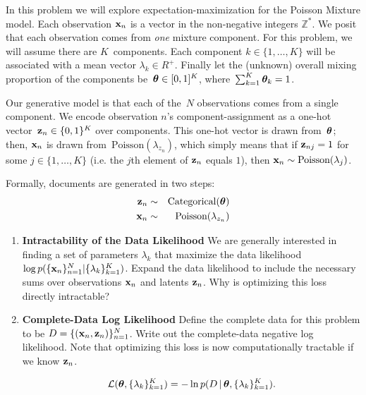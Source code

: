 \documentclass[submit]{harvardml}
\begin{document}
\begin{problem}

In this problem we will explore expectation-maximization for the
Poisson Mixture model.  Each observation $\mathbf{x}_n$ is a vector in the
non-negative integers $\mathbb{Z}^{*}$.  We posit that each
observation comes from \emph{one} mixture component.  For this
problem, we will assume there are $K$~components. Each component $k
\in \{1, \ldots, K\}$ will be associated with a mean vector $\lambda_k
\in R^{+}$.  Finally let the (unknown) overall mixing proportion of
the components be~$\boldsymbol{\theta} \in [0,1]^K$, where~${\sum_{k=1}^K
  \boldsymbol{\theta}_k=1}$.

Our generative model is that each of the~$N$ observations comes from a
single component.  We encode observation $n$'s component-assignment as
a one-hot vector~${\mathbf{z}_n \in \{0,1\}^K}$ over components. This
one-hot vector is drawn from~$\boldsymbol{\theta}$; then, $\mathbf{x}_n$ is drawn
from~$\text{Poisson}(\lambda_{z_n} )$, which simply means that if $\mathbf{z}_{nj} = 1$ for some $j \in \{1,\ldots, K\}$ (i.e. the $j$th element of $\mathbf{z}_n$ equals $1$), then $\mathbf{x}_n \sim \text{Poisson}(\lambda_j)$. 

Formally, documents are generated in two
steps:
\begin{eqnarray*}
 \mathbf{z}_n &\sim& \text{Categorical}(\boldsymbol{\theta}) \\
 \mathbf{x}_n &\sim& \text{Poisson}(\lambda_{z_n} )
\end{eqnarray*}

  \begin{enumerate}

  \item \textbf{Intractability of the Data Likelihood} We are
    generally interested in finding a set of parameters $\lambda_k$
    that maximize the data likelihood $\log p(\{\mathbf{x}_n\}^N_{n=1}|\{\lambda_k\}^K_{k = 1})$.
    Expand the data likelihood to include the necessary sums over
    observations $\mathbf{x}_n$ and latents $\mathbf{z}_n$.  Why is optimizing this loss
    directly intractable?
    
\item \textbf{Complete-Data Log Likelihood} Define the complete data for this problem to be $D = \{(\mathbf{x}_n, \mathbf{z}_n)\}_{n=1}^N$. Write out the complete-data negative log likelihood. Note that optimizing this loss is now computationally tractable if we know $\mathbf{z}_n$.

\[\mathcal{L}(\boldsymbol{\theta}, \{\lambda_k\}^K_{k=1}) =  -\ln p(D \,|\,\boldsymbol{\theta}, \{\lambda_k\}^K_{k=1}).\] 
    


\end{enumerate}
\end{problem}
\end{document}
